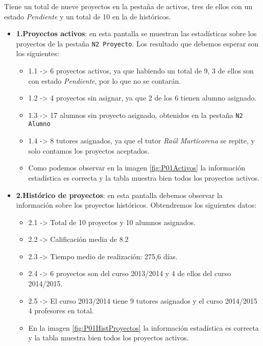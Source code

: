 Tiene un total de nueve proyectos en la pestaña de activos, tres de ellos con un estado \emph{Pendiente} y un total de 10 en la de históricos.

\begin{itemize}
	\item \textbf{1.Proyectos activos}: en esta pantalla se muestran las estadísticas sobre los proyectos de la pestaña \texttt{N2 Proyecto}. Los resultado que debemos esperar son los siguientes:
		\begin{itemize}
			\item 1.1 -> 6 proyectos activos, ya que habiendo un total de 9, 3 de ellos son con estado \emph{Pendiente}, por lo que no se contarán.
			\item 1.2 -> 4 proyectos sin asignar, ya que 2 de los 6 tienen alumno asignado.
			\item 1.3 -> 17 alumnos sin proyecto asignado, obtenidos en la pestaña \texttt{N2 Alumno}
			\item 1.4 -> 8 tutores asignados, ya que el tutor \emph{Raúl Marticorena} se repite, y solo contamos los proyectos aceptados.
			
			\item  Como podemos observar en la imagen \ref{fig:P01Activos} la información estadística es correcta y la tabla muestra bien todos los proyectos activos.
		\end{itemize}
	
	\item \textbf{2.Histórico de proyectos}: en esta pantalla debemos observar la información sobre los proyectos históricos. Obtendremos los siguientes datos:
		\begin{itemize}
			\item 2.1 -> Total de 10 proyectos y 10 alumnos asignados.
			\item 2.2 -> Calificación media de 8.2
			\item 2.3 -> Tiempo medio de realización: 275,6 días.
			\item 2.4 -> 6 proyectos son del curso 2013/2014 y 4 de ellos del curso 2014/2015. 
			\item 2.5 -> El curso 2013/2014 tiene 9 tutores asignados y el curso 2014/2015 4 profesores en total.
			
			\item En la imagen \ref{fig:P01HistProyectos} la información estadística es correcta y la tabla muestra bien todos los proyectos activos.
		\end{itemize}
	

\end{itemize}

